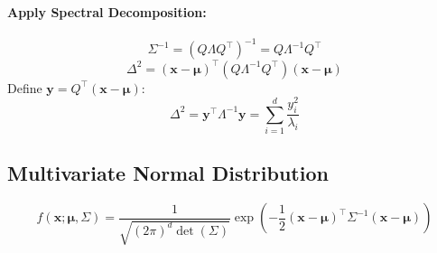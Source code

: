 \documentclass{article}
\begin{document}
\paragraph{Apply Spectral Decomposition:}
\[
    \Sigma^{-1} = (Q \Lambda Q^\top)^{-1} = Q \Lambda^{-1} Q^\top
\]
\[
    \Delta^2 = (\mathbf{x} - \boldsymbol{\mu})^\top (Q \Lambda^{-1} Q^\top) (\mathbf{x} - \boldsymbol{\mu})
\]
Define \( \mathbf{y} = Q^\top (\mathbf{x} - \boldsymbol{\mu}) \):
\[
    \Delta^2 = \mathbf{y}^\top \Lambda^{-1} \mathbf{y} = \sum_{i=1}^{d} \frac{y_i^2}{\lambda_i}
\]

\subsection{Multivariate Normal Distribution}
\[
    f(\mathbf{x}; \boldsymbol{\mu}, \Sigma) = \frac{1}{\sqrt{(2\pi)^d\det(\Sigma)}} \exp\left(-\frac{1}{2}(\mathbf{x} - \boldsymbol{\mu})^\top \Sigma^{-1} (\mathbf{x} - \boldsymbol{\mu})\right)
\]
\end{document}
